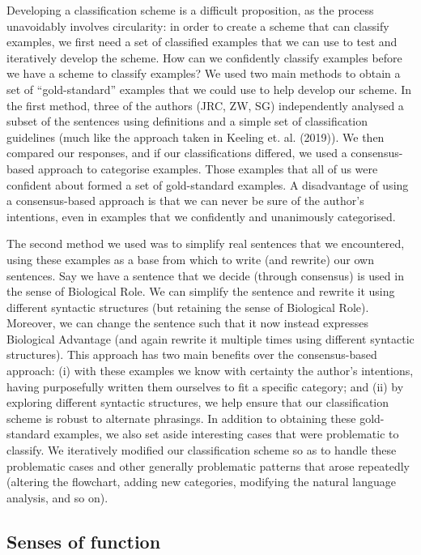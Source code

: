 \documentclass{article}
\begin{document}
Developing a classification scheme is a difficult proposition, as the process unavoidably involves circularity: in order to create a scheme that can classify examples, we first need a set of classified examples that we can use to test and iteratively develop the scheme.
How can we confidently classify examples before we have a scheme to classify examples?
We used two main methods to obtain a set of ``gold-standard'' examples that we could use to help develop our scheme.
In the first method, three of the authors (JRC, ZW, SG) independently analysed a subset of the sentences using definitions and a simple set of classification guidelines (much like the approach taken in Keeling et. al. (2019)).
We then compared our responses, and if our classifications differed, we used a consensus-based approach to categorise examples.
Those examples that all of us were confident about formed a set of gold-standard examples.
A disadvantage of using a consensus-based approach is that we can never be sure of the author's intentions, even in examples that we confidently and unanimously categorised.

The second method we used was to simplify real sentences that we encountered, using these examples as a base from which to write (and rewrite) our own sentences.
Say we have a sentence that we decide (through consensus) is used in the sense of Biological Role.
We can simplify the sentence and rewrite it using different syntactic structures (but retaining the sense of Biological Role).
Moreover, we can change the sentence such that it now instead expresses Biological Advantage (and again rewrite it multiple times using different syntactic structures).
This approach has two main benefits over the consensus-based approach: (i) with these examples we know with certainty the author's intentions, having purposefully written them ourselves to fit a specific category; and (ii) by exploring different syntactic structures, we help ensure that our classification scheme is robust to alternate phrasings.
In addition to obtaining these gold-standard examples, we also set aside interesting cases that were problematic to classify.
We iteratively modified our classification scheme so as to handle these problematic cases and other generally problematic patterns that arose repeatedly (altering the flowchart, adding new categories, modifying the natural language analysis, and so on).

\subsection{Senses of function}
\label{sec:senses-function}
\end{document}
